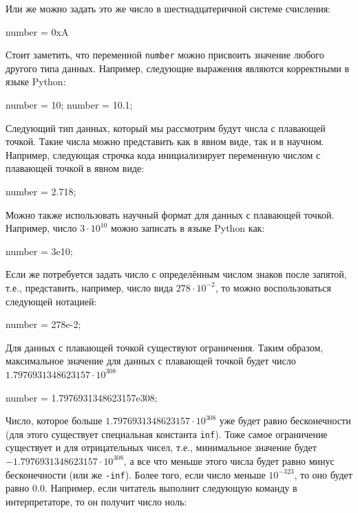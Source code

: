 Или же можно задать это же число в шестнадцатеричной системе счисления:

\begin{python}
number = 0xA
\end{python}

Стоит заметить, что переменной \texttt{number} можно присвоить значение
любого другого типа данных. Например, следующие выражения являются корректными
в языке Python:

\begin{python}
number = 10;
number = 10.1;
\end{python}

Следующий тип данных, который мы рассмотрим будут числа с плавающей точкой.
Такие числа можно представить как в явном виде, так и в научном. Например,
следующая строчка кода инициализирует переменную числом с плавающей точкой 
в явном виде:

\begin{python}
number = 2.718;
\end{python}

Можно также использовать научный формат для данных с плавающей точкой.
Например, число $3\cdot10^{10}$ можно записать в языке Python как:

\begin{python}
number = 3e10;
\end{python}

Если же потребуется задать число с определённым числом знаков после запятой, т.е., представить, например, 
число вида $278\cdot10^{-2}$, то можно воспользоваться следующей нотацией:

\begin{python}
number = 278e-2;
\end{python} 

Для данных с плавающей точкой существуют ограничения. Таким образом, максимальное
значение для данных с плавающей точкой будет число $1.7976931348623157\cdot10^{308}$

\begin{python}
number = 1.7976931348623157e308;
\end{python}

Число, которое больше $1.7976931348623157\cdot10^{308}$ уже будет равно 
бесконечности (для этого существует специальная 
константа \texttt{inf}). Тоже самое ограничение существует и для отрицательных чисел,
т.е., минимальное значение будет $-1.7976931348623157\cdot10^{308}$, а все что меньше этого числа будет равно 
минус бесконечности (или же \texttt{-inf}). Более того, если число меньше $10^{-323}$,
то оно будет равно $0.0$. Например, если читатель выполнит следующую команду в интерпретаторе,
то он получит число ноль:

